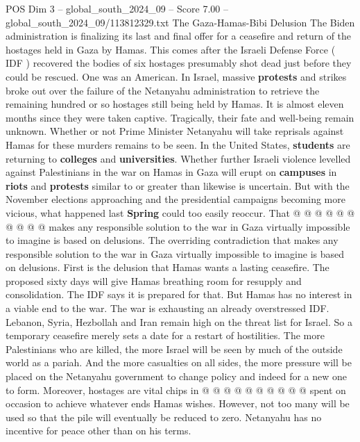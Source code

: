 \begin{textsample}{POS Dim 3 – global\_south\_2024\_09 – Score 7.00 – global\_south\_2024\_09/113812329.txt}  \label{ex:f3_pos_327}
The Gaza-Hamas-Bibi Delusion The Biden administration is finalizing its last and final offer for a ceasefire and return of the hostages held in Gaza by Hamas.
This comes after the Israeli Defense Force ( IDF ) recovered the bodies of six hostages presumably shot dead just before they could be rescued.
One was an American.
In Israel, massive \textbf{protests} and strikes broke out over the failure of the Netanyahu administration to retrieve the remaining hundred or so hostages still being held by Hamas.
It is almost eleven months since they were taken captive.
Tragically, their fate and well-being remain unknown.
Whether or not Prime Minister Netanyahu will take reprisals against Hamas for these murders remains to be seen.
In the United States, \textbf{students} are returning to \textbf{colleges} and \textbf{universities}.
Whether further Israeli violence levelled against Palestinians in the war on Hamas in Gaza will erupt on \textbf{campuses} in \textbf{riots} and \textbf{protests} similar to or greater than likewise is uncertain.
But with the November elections approaching and the presidential campaigns becoming more vicious, what happened last \textbf{Spring} could too easily reoccur.
That @ @ @ @ @ @ @ @ @ @ makes any responsible solution to the war in Gaza virtually impossible to imagine is based on delusions.
The overriding contradiction that makes any responsible solution to the war in Gaza virtually impossible to imagine is based on delusions.
First is the delusion that Hamas wants a lasting ceasefire.
The proposed sixty days will give Hamas breathing room for resupply and consolidation.
The IDF says it is prepared for that.
But Hamas has no interest in a viable end to the war.
The war is exhausting an already overstressed IDF.
Lebanon, Syria, Hezbollah and Iran remain high on the threat list for Israel.
So a temporary ceasefire merely sets a date for a restart of hostilities.
The more Palestinians who are killed, the more Israel will be seen by much of the outside world as a pariah.
And the more casualties on all sides, the more pressure will be placed on the Netanyahu government to change policy and indeed for a new one to form.
Moreover, hostages are vital chips in @ @ @ @ @ @ @ @ @ @ spent on occasion to achieve whatever ends Hamas wishes.
However, not too many will be used so that the pile will eventually be reduced to zero.
Netanyahu has no incentive for peace other than on his terms.

\end{textsample}
